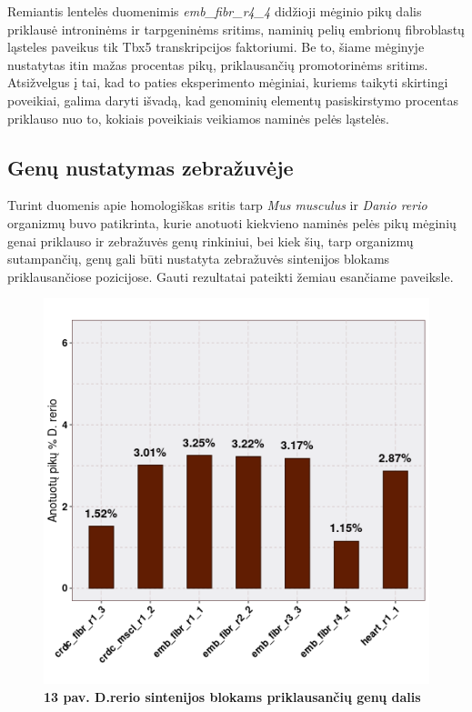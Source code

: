 \documentclass[12pt]{article}
\begin{document}
Remiantis lentelės duomenimis \emph{emb\_fibr\_r4\_4} didžioji mėginio pikų
dalis priklausė introninėms ir tarpgeninėms sritims, naminių pelių embrionų
fibroblastų ląsteles paveikus tik Tbx5 transkripcijos faktoriumi. Be to, šiame
mėginyje nustatytas itin mažas procentas pikų, priklausančių promotorinėms
sritims. Atsižvelgus į tai, kad to paties eksperimento mėginiai, kuriems taikyti
skirtingi poveikiai, galima daryti išvadą, kad genominių elementų pasiskirstymo
procentas priklauso nuo to, kokiais poveikiais veikiamos naminės pelės ląstelės.

\newpage

\subsection{Genų nustatymas zebražuvėje}
Turint duomenis apie homologiškas sritis tarp \emph{Mus musculus} ir
\emph{Danio rerio} organizmų buvo patikrinta, kurie anotuoti kiekvieno naminės
pelės pikų mėginių genai priklauso ir zebražuvės genų rinkiniui, bei kiek šių,
tarp organizmų sutampančių, genų gali būti nustatyta zebražuvės sintenijos
blokams priklausančiose pozicijose. Gauti rezultatai pateikti žemiau esančiame
paveiksle.

\begin{figure}[htb]
    \begin{center}
        \includegraphics[width=0.7\linewidth]{../Figures/Unique_genes_DR.png}
        \vspace{-2\baselineskip}
        \caption*{\small\textbf{13 pav. D.rerio sintenijos blokams priklausančių
        genų dalis}}
        \label{fig:birds}
    \end{center}
\end{figure}
\end{document}
